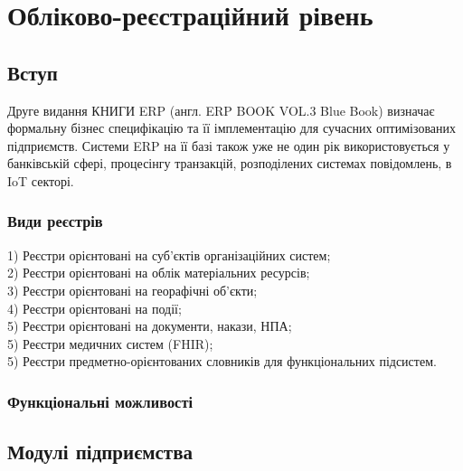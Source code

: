 \chapter{Обліково-реєстраційний рівень}

\section{Вступ}

Друге видання КНИГИ ERP (англ. ERP BOOK VOL.3 Blue Book) визначає формальну
бізнес специфікацію та її імплементацію для сучасних оптимізованих підприємств.
Системи ERP на її базі також уже не один рік використовується у банківській сфері,
процесінгу транзакцій, розподілених системах повідомлень, в IoT секторі.

\subsection{Види реєстрів}

1) Реєстри орієнтовані на суб'єктів організаційних систем; \\
2) Реєстри орієнтовані на облік матеріальних ресурсів; \\
3) Реєстри орієнтовані на георафічні об'єкти; \\
4) Реєстри орієнтовані на події; \\
5) Реєстри орієнтовані на документи, накази, НПА; \\
5) Реєстри медичних систем (FHIR); \\
5) Реєстри предметно-орієнтованих словників для функціональних підсистем. \\

\subsection{Функціональні можливості}

\newpage
\section{Модулі підприємства}

